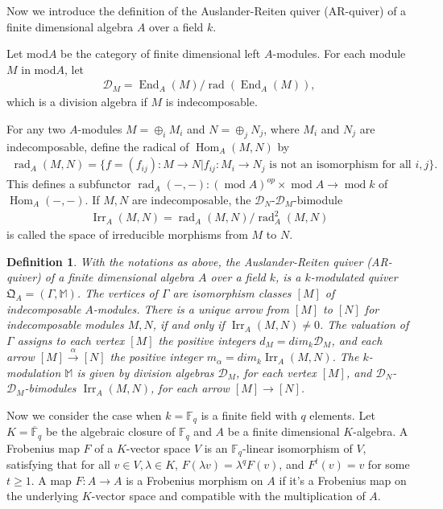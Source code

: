 \documentclass[12pt]{amsart}
\newtheorem{definition}[theorem]{Definition}
\begin{document}
Now we introduce the definition of the Auslander-Reiten quiver (AR-quiver) of a finite dimensional algebra $A$ over a field $k$.

Let mod$A$ be the category of finite dimensional left $A$-modules.
For each module $M$ in mod$A$, let 
\begin{align*}
    \mathcal{D}_M = \operatorname{End}_A(M)/\operatorname{rad} (\operatorname{End}_A(M)), 
\end{align*}
which is a division algebra if $M$ is indecomposable.

For any two $A$-modules $M=\oplus_i M_i$ and $N=\oplus_j N_j$, where $M_i$ and $N_j$ are indecomposable, define the radical of $\operatorname{Hom}_A(M,N)$ by 
\begin{align*}
    \operatorname{rad}_A(M,N) = \{ f=(f_{ij}):M\rightarrow N | f_{ij}:M_i\rightarrow N_j  \text{ is not an isomorphism for all } i,j \}.
\end{align*}
This defines a subfunctor $\operatorname{rad}_A(-,-):(\operatorname{mod}A)^{op}\times \operatorname{mod}A \rightarrow \operatorname{mod}k$ of $\operatorname{Hom}_A(-,-)$.
If $M,N$ are indecomposable, the $\mathcal{D}_N$-$\mathcal{D}_M$-bimodule 
\begin{align*}
    \operatorname{Irr}_A(M,N) = \operatorname{rad}_A(M,N)/\operatorname{rad}_A^2(M,N)
\end{align*}
 is called the space of irreducible morphisms from $M$ to $N$.

\begin{definition}
    With the notations as above,
    the Auslander-Reiten quiver (AR-quiver) of a finite dimensional algebra $A$ over a field $k$, is a $k$-modulated quiver $\mathfrak{Q}_A=(\Gamma,\mathbb{M})$.
    The vertices of $\Gamma$ are isomorphism classes $[M]$ of indecomposable $A$-modules.
    There is a unique arrow from $[M]$ to $[N]$ for indecomposable modules $M,N$, if and only if $\operatorname{Irr}_A(M,N)\neq 0$.
    The valuation of $\Gamma$ assigns to each vertex $[M]$ the positive integers $d_M = dim_k \mathcal{D}_M$, and each arrow $[M] \xrightarrow{\alpha} [N]$ the positive integer $m_{\alpha} = dim_k \operatorname{Irr}_A(M,N)$.
    The $k$-modulation $\mathbb{M}$ is given by division algebras $\mathcal{D}_M$, for each vertex $[M]$, and $\mathcal{D}_N$-$\mathcal{D}_M$-bimodules $\operatorname{Irr}_A(M,N)$, for each arrow $[M]\rightarrow [N]$.
\end{definition}


Now we consider the case when $k=\mathbb{F}_q$ is a finite field with $q$ elements.
Let $K=\overline{\mathbb{F}}_q$ be the algebraic closure of $\mathbb{F}_q$ and $A$ be a finite dimensional $K$-algebra. 
A Frobenius map $F$ of a $K$-vector space $V$ is an $\mathbb{F}_q$-linear isomorphism of $V$, satisfying that for all $v\in V,\lambda \in K$, $F(\lambda v)=\lambda^q F(v)$, and $F^t(v)=v$ for some $t\geq 1$. 
A map $F:A\rightarrow A$ is a Frobenius morphism on $A$ if it's a Frobenius map on the underlying $K$-vector space and compatible with the multiplication of $A$. 
\end{document}
